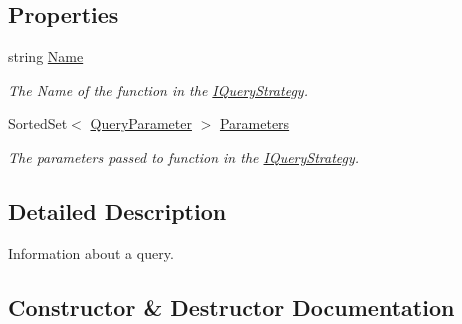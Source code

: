 \subsection*{Properties}
\begin{DoxyCompactItemize}
\item 
string \hyperlink{classCqrs_1_1Repositories_1_1Queries_1_1QueryPredicate_a39ade65d87e51fcf9abf8e79cb5d62df_a39ade65d87e51fcf9abf8e79cb5d62df}{Name}
\begin{DoxyCompactList}\small\item\em The Name of the function in the \hyperlink{interfaceCqrs_1_1Repositories_1_1Queries_1_1IQueryStrategy}{I\+Query\+Strategy}. \end{DoxyCompactList}\item 
Sorted\+Set$<$ \hyperlink{classCqrs_1_1Repositories_1_1Queries_1_1QueryParameter}{Query\+Parameter} $>$ \hyperlink{classCqrs_1_1Repositories_1_1Queries_1_1QueryPredicate_abc33bd25e43bcef2a084cde97bc478e6_abc33bd25e43bcef2a084cde97bc478e6}{Parameters}
\begin{DoxyCompactList}\small\item\em The parameters passed to function in the \hyperlink{interfaceCqrs_1_1Repositories_1_1Queries_1_1IQueryStrategy}{I\+Query\+Strategy}. \end{DoxyCompactList}\end{DoxyCompactItemize}


\subsection{Detailed Description}
Information about a query. 



\subsection{Constructor \& Destructor Documentation}
\mbox{\label{classCqrs_1_1Repositories_1_1Queries_1_1QueryPredicate_ab690c78e98470fe4e219380db1c0e52c_ab690c78e98470fe4e219380db1c0e52c}} 
